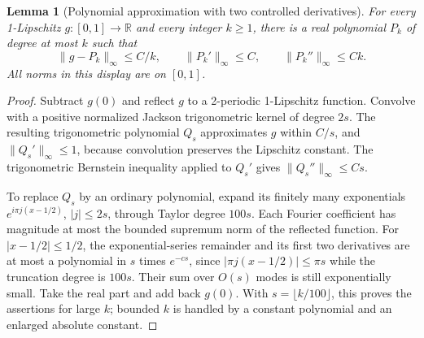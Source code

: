\documentclass[11pt,a4paper]{article}
\newtheorem{lemma}[theorem]{Lemma}
\theoremstyle{definition}
\theoremstyle{remark}
\numberwithin{equation}{section}
\begin{document}
\begin{lemma}[Polynomial approximation with two controlled derivatives]
\label{p5:gg:poly}
For every 1-Lipschitz $g:[0,1]\to\mathbb R$ and every integer
$k\ge1$, there is a real polynomial $P_k$ of degree at most $k$
such that
\[
 \|g-P_k\|_\infty\le C/k,\qquad
 \|P_k'\|_\infty\le C,\qquad
 \|P_k''\|_\infty\le Ck.
\]
All norms in this display are on $[0,1]$.
\end{lemma}
\begin{proof}
Subtract $g(0)$ and reflect $g$ to a 2-periodic 1-Lipschitz function.
Convolve with a positive normalized Jackson trigonometric kernel
of degree $2s$.  The resulting trigonometric polynomial $Q_s$
approximates $g$ within $C/s$, and $\|Q_s'\|_\infty\le1$,
because convolution preserves the Lipschitz constant.  The
trigonometric Bernstein inequality applied to $Q_s'$ gives
$\|Q_s''\|_\infty\le Cs$.

To replace $Q_s$ by an ordinary polynomial, expand its finitely
many exponentials $e^{i\pi j(x-1/2)}$, $|j|\le2s$, through
Taylor degree $100s$.  Each Fourier coefficient has magnitude
at most the bounded supremum norm of the reflected function.
For $|x-1/2|\le1/2$, the exponential-series remainder and its first
two derivatives are at most a polynomial in $s$ times $e^{-cs}$,
since $|\pi j(x-1/2)|\le\pi s$ while the truncation degree is
$100s$.  Their sum over $O(s)$ modes is still exponentially small.
Take the real part and add back $g(0)$.  With
$s=\lfloor k/100\rfloor$, this proves the assertions for large
$k$; bounded $k$ is handled by a constant polynomial and an enlarged
absolute constant.
\end{proof}
\end{document}
